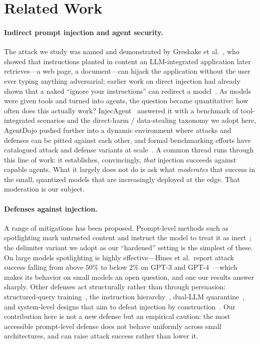 \documentclass[11pt]{article}
\begin{document}
\section{Related Work}
\label{sec:related}

\paragraph{Indirect prompt injection and agent security.}
The attack we study was named and demonstrated by Greshake et
al.~\cite{greshake2023}, who showed that instructions planted in content an
LLM-integrated application later retrieves---a web page, a document---can
hijack the application without the user ever typing anything adversarial;
earlier work on direct injection had already shown that a naked ``ignore
your instructions'' can redirect a model~\cite{perez2022ignore}. As models
were given tools and turned into agents, the question became quantitative:
how often does this actually work? InjecAgent~\cite{zhan2024injecagent}
answered it with a benchmark of tool-integrated scenarios and the
direct-harm / data-stealing taxonomy we adopt here, AgentDojo
\cite{debenedetti2024agentdojo} pushed further into a dynamic environment
where attacks and defenses can be pitted against each other, and formal
benchmarking efforts have catalogued attack and defense variants at
scale~\cite{liu2024promptinjection, yi2023benchmarking}. A common thread
runs through this line of work: it establishes, convincingly, \emph{that}
injection succeeds against capable agents. What it largely does not do is
ask what \emph{moderates} that success in the small, quantized models that
are increasingly deployed at the edge. That moderation is our subject.

\paragraph{Defenses against injection.}
A range of mitigations has been proposed. Prompt-level methods such as
spotlighting mark untrusted content and instruct the model to treat it as
inert~\cite{hines2024spotlighting}; the delimiter variant we adopt as our
``hardened'' setting is the simplest of these. On large models spotlighting
is highly effective---Hines et al.\ report attack success falling from above
$50\%$ to below $2\%$ on GPT-3 and GPT-4~\cite{hines2024spotlighting}---which
makes its behavior on small models an open question, and one our results
answer sharply. Other defenses act structurally rather than through
persuasion: structured-query training~\cite{chen2024struq}, the instruction
hierarchy~\cite{wallace2024instruction}, dual-LLM
quarantine~\cite{willison2023dual}, and system-level designs that aim to
defeat injection by construction~\cite{debenedetti2025defeating}. Our
contribution here is not a new defense but an empirical caution: the most
accessible prompt-level defense does not behave uniformly across small
architectures, and can raise attack success rather than lower it.
\end{document}
